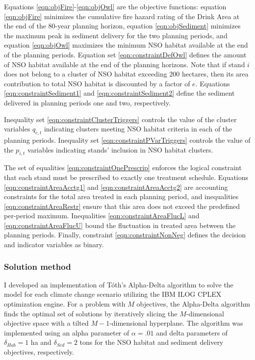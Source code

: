 Equations \eqref{eqn:objFire}-\eqref{eqn:objOwl} are the objective functions: equation \eqref{eqn:objFire} minimizes the cumulative fire hazard rating of the Drink Area at the end of the 80-year planning horizon, equation \eqref{eqn:objSediment} minimizes the maximum peak in sediment delivery for the two planning periods, and equation \eqref{eqn:objOwl} maximizes the minimum NSO habitat available at the end of the planning periods. Equation set \eqref{eqn:constraintDefOwl} defines the amount of NSO habitat available at the end of the planning horizons. Note that if stand $i$ does not belong to a cluster of NSO habitat exceeding 200 hectares, then its area contribution to total NSO habitat is discounted by a factor of $e$. Equations \eqref{eqn:constraintSediment1} and \eqref{eqn:constraintSediment2} define the sediment delivered in planning periods one and two, respectively.

Inequality set \eqref{eqn:constraintClusterTriggers} controls the value of the cluster variables $q_{c,t}$ indicating clusters meeting NSO habitat criteria in each of the planning periods. Inequality set \eqref{eqn:constraintPVarTriggers} controls the value of the $p_{i,t}$ variables indicating stands' inclusion in NSO habitat clusters.

The set of equalities \eqref{eqn:constraintOnePrescrip} enforces the logical constraint that each stand must be prescribed to exactly one treatment schedule. Equations \eqref{eqn:constraintAreaAcctg1} and \eqref{eqn:constraintAreaAcctg2} are accounting constraints for the total area treated in each planning period, and inequalities \eqref{eqn:constraintAreaRestr} ensure that this area does not exceed the predefined per-period maximum. Inequalities \eqref{eqn:constraintAreaFlucL} and \eqref{eqn:constraintAreaFlucU} bound the fluctuation in treated area between the planning periods. Finally, constraint \eqref{eqn:constraintNonNeg} defines the decision and indicator variables as binary.

\subsubsection{Solution method}
I developed an implementation of T\'{o}th's Alpha-Delta algorithm \cite{TothThesis} to solve the model for each climate change scenario utilizing the IBM ILOG CPLEX optimization engine. For a problem with $M$ objectives, the Alpha-Delta algorithm finds the optimal set of solutions by iteratively slicing the $M$-dimensional objective space with a tilted $M-1$-dimensional hyperplane. The algorithm was implemented using an alpha parameter of $\alpha = .01$ and delta parameters of $\delta_{Hab} = 1$ ha and $\delta_{Sed} = 2$ tons for the NSO habitat and sediment delivery objectives, respectively.